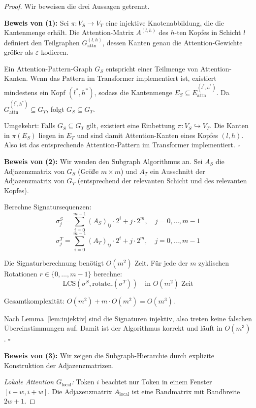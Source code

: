 ﻿\documentclass[a4paper,12pt]{article}
\theoremstyle{definition}
\begin{document}
\begin{proof}
Wir beweisen die drei Aussagen getrennt.

\textbf{Beweis von (1):} Sei $\pi: V_S \to V_T$ eine injektive Knotenabbildung,
die die Kantenmenge erhält. Die Attention-Matrix $A^{(l,h)}$ des $h$-ten Kopfes
in Schicht $l$ definiert den Teilgraphen $G_{\mathrm{attn}}^{(l,h)}$, dessen
Kanten genau die Attention-Gewichte größer als $\varepsilon$ kodieren.

Ein Attention-Pattern-Graph $G_S$ entspricht einer Teilmenge von Attention-Kanten.
Wenn das Pattern im Transformer implementiert ist, existiert mindestens ein Kopf
$(l^*, h^*)$, sodass die Kantenmenge $E_S \subseteq E_{\mathrm{attn}}^{(l^*, h^*)}$.
Da $G_{\mathrm{attn}}^{(l^*, h^*)} \subseteq G_T$, folgt $G_S \subseteq G_T$.

Umgekehrt: Falls $G_S \subseteq G_T$ gilt, existiert eine Einbettung
$\pi: V_S \hookrightarrow V_T$. Die Kanten in $\pi(E_S)$ liegen in $E_T$ und
sind damit Attention-Kanten eines Kopfes $(l, h)$. Also ist das entsprechende
Attention-Pattern im Transformer implementiert. \qquad $\square$

\textbf{Beweis von (2):} Wir wenden den Subgraph Algorithmus an.
Sei $A_S$ die Adjazenzmatrix von $G_S$ (Größe $m \times m$) und $A_T$ ein
Ausschnitt der Adjazenzmatrix von $G_T$ (entsprechend der relevanten Schicht
und des relevanten Kopfes).

Berechne Signatursequenzen:
\[
\sigma_j^S = \sum_{i=0}^{m-1} (A_S)_{ij} \cdot 2^i + j \cdot 2^m, \quad j = 0,\ldots,m-1
\]
\[
\sigma_j^T = \sum_{i=0}^{m-1} (A_T)_{ij} \cdot 2^i + j \cdot 2^m, \quad j = 0,\ldots,m-1
\]

Die Signaturberechnung benötigt $O(m^2)$ Zeit. Für jede der $m$ zyklischen
Rotationen $r \in \{0,\ldots,m-1\}$ berechne:
\[
\mathrm{LCS}(\sigma^S, \mathrm{rotate}_r(\sigma^T)) \quad \text{in } O(m^2) \text{ Zeit}
\]

Gesamtkomplexität: $O(m^2) + m \cdot O(m^2) = O(m^3)$.

Nach Lemma~\ref{lem:injektiv} sind die Signaturen injektiv, also treten
keine falschen Übereinstimmungen auf. Damit ist der Algorithmus korrekt
und läuft in $O(m^3)$. \qquad $\square$

\textbf{Beweis von (3):} Wir zeigen die Subgraph-Hierarchie durch
explizite Konstruktion der Adjazenzmatrizen.

\textit{Lokale Attention $G_{\mathrm{local}}$:} Token $i$ beachtet nur
Token in einem Fenster $[i-w, i+w]$. Die Adjazenzmatrix $A_{\mathrm{local}}$
ist eine Bandmatrix mit Bandbreite $2w+1$.


\end{proof}
\end{document}
